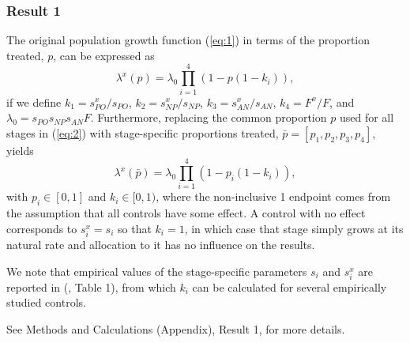\documentclass[onecolumn]{article}
\begin{document}
\subsubsection*{Result 1}
The original population growth function (\ref{eq:1}) in terms of the proportion treated, $p$, can be expressed as
\begin{equation}\label{eq:2} \lambda^x(p) = \lambda_0 \prod_{i=1}^4 \left(1 - p(1 - k_i)\right), \end{equation}
if we define $k_1 = s^x_{PO}/s_{PO}$, $k_2 = s^x_{NP}/s_{NP}$, $k_3 = s^x_{AN}/s_{AN}$, $k_4 = F^x/F$, and $\lambda_0 = s_{PO} s_{NP} s_{AN} F$.
Furthermore, replacing the common proportion $p$ used for all stages in (\ref{eq:2}) with stage-specific proportions treated, $\bar{p} = [p_1, p_2, p_3, p_4]$, yields
\begin{equation}\label{eq:3} \lambda^x(\bar{p}) = \lambda_0 \prod_{i=1}^4 \left(1 - p_i(1 - k_i)\right), \end{equation}
with $p_i \in [0,1]$ and $k_i \in [0,1)$, where the non-inclusive 1 endpoint comes from the assumption that all controls have some effect. A control with no effect corresponds to $s_i^x = s_i$ so that $k_i = 1$, in which case that stage simply grows at its natural rate and allocation to it has no influence on the results.

We note that empirical values of the stage-specific parameters $s_i$ and $s_i^x$ are reported in (\citep{Strombom2021}, Table 1), from which $k_i$ can be calculated for several empirically studied controls.

See Methods and Calculations (Appendix), Result 1, for more details.
\end{document}
